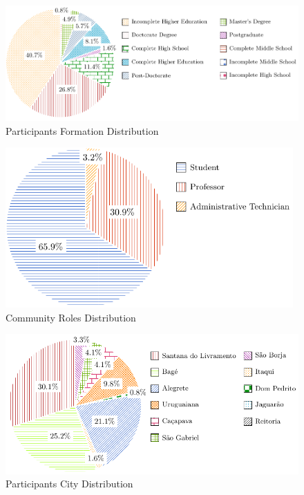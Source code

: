 \begin{figure}[!htb]
  \caption{Participants Formation Distribution}\label{fig:formation-distribution}
  \begin{center}
    \includegraphics[width=17cm]{img/5-participants-formation.pdf}
  \end{center}
\end{figure}

\begin{figure}[!htb]
  \caption{Community Roles Distribution}\label{fig:community-roles}
  \begin{center}
    \includegraphics[width=11cm]{img/5-community-roles.pdf}
  \end{center}
\end{figure}

\begin{figure}[!htb]
  \caption{Participants City Distribution}\label{fig:city-distribution}
  \begin{center}
    \includegraphics[width=14cm]{img/5-participants-city.pdf}
  \end{center}
\end{figure}

